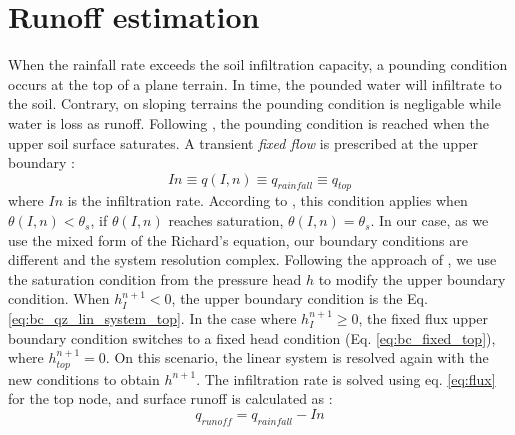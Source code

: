 \documentclass[a4paper,12pt]{article}
\begin{document}
\section{Runoff estimation}
When the rainfall rate exceeds the soil infiltration capacity, a pounding condition occurs at the top of a plane terrain. In time, the pounded water will infiltrate to the soil. Contrary, on sloping terrains the pounding condition is negligable while water is loss as runoff. Following \cite{Herradaetal2014}, the pounding condition is reached when the upper soil surface saturates.
A transient \emph{fixed flow} is prescribed at the upper boundary \citep{Herradaetal2014}:
 \begin{equation} \label{eq:run_pres_inf}
 	In \equiv q(I,n) \equiv q_{rainfall} \equiv q_{top}
\end{equation}
where $In$ is the infiltration rate.
According to \cite{Herradaetal2014}, this condition applies when $\theta(I,n)<\theta_s$, if $\theta(I,n)$ reaches saturation, $\theta(I,n)=\theta_s$.
In our case, as we use the mixed form of the Richard's equation, our boundary conditions are different and the system resolution complex. Following the approach of \cite{Herradaetal2014}, we use the saturation condition from the pressure head $h$ to modify the upper boundary condition. When $h_I^{n+1}<0$, the upper boundary condition is the Eq. \ref{eq:bc_qz_lin_system_top}. In the case where $h_I^{n+1}\geq0$, the fixed flux upper boundary condition switches to a fixed head condition (Eq. \ref{eq:bc_fixed_top}), where $h_{top}^{n+1}=0$. On this scenario, the linear system is resolved again with the new conditions to obtain $h^{n+1}$. The infiltration rate is solved using eq. \ref{eq:flux} for the top node, and surface runoff is calculated as \citep{Herradaetal2014}:
\begin{equation} \label{eq:run_run}
    q_{runoff}=q_{rainfall}-In
\end{equation}
\end{document}
